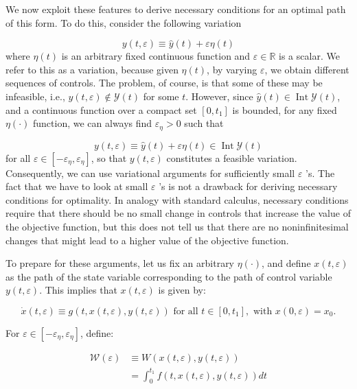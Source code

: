 \documentclass[\topdir/lecture_notes.tex]{subfiles}
\begin{document}
We now exploit these features to derive necessary conditions for an optimal path of this form. To do this, consider the following variation

\[
y(t, \varepsilon) \equiv \hat{y}(t)+\varepsilon \eta(t)
\]
where $\eta(t)$ is an arbitrary fixed continuous function and $\varepsilon \in \mathbb{R}$ is a scalar. We refer to this as a variation, because given $\eta(t)$, by varying $\varepsilon$, we obtain different sequences of controls. The problem, of course, is that some of these may be infeasible, i.e., $y(t, \varepsilon) \notin \mathcal{Y}(t)$ for some $t$. However, since $\hat{y}(t) \in \operatorname{Int} \mathcal{Y}(t)$, and a continuous function over a compact set $\left[0, t_{1}\right]$ is bounded, for any fixed $\eta(\cdot)$ function, we can always find $\varepsilon_{\eta}>0$ such that

\[
y(t, \varepsilon) \equiv \hat{y}(t)+\varepsilon \eta(t) \in \operatorname{Int} \mathcal{Y}(t)
\]
for all $\varepsilon \in\left[-\varepsilon_{\eta}, \varepsilon_{\eta}\right]$, so that $y(t, \varepsilon)$ constitutes a feasible variation. Consequently, we can use variational arguments for sufficiently small $\varepsilon$ 's. The fact that we have to look at small $\varepsilon$ 's is not a drawback for deriving necessary conditions for optimality. In analogy with standard calculus, necessary conditions require that there should be no small change in controls that increase the value of the objective function, but this does not tell us that there are no noninfinitesimal changes that might lead to a higher value of the objective function.

To prepare for these arguments, let us fix an arbitrary $\eta(\cdot)$, and define $x(t, \varepsilon)$ as the path of the state variable corresponding to the path of control variable $y(t, \varepsilon)$. This implies that $x(t, \varepsilon)$ is given by:

\[
\dot{x}(t, \varepsilon) \equiv g(t, x(t, \varepsilon), y(t, \varepsilon)) \text { for all } t \in\left[0, t_{1}\right], \text { with } x(0, \varepsilon)=x_{0} .
\]

For $\varepsilon \in\left[-\varepsilon_{\eta}, \varepsilon_{\eta}\right]$, define:

\[
\begin{aligned}
\mathcal{W}(\varepsilon) & \equiv W(x(t, \varepsilon), y(t, \varepsilon)) \\
& =\int_{0}^{t_{1}} f(t, x(t, \varepsilon), y(t, \varepsilon)) d t
\end{aligned}
\]
\end{document}

